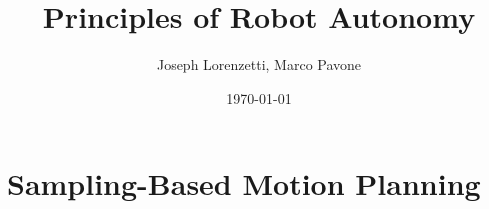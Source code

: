 \documentclass[nohyper,nobib]{tufte-book}
\title{Principles of Robot Autonomy}
\author{Joseph Lorenzetti, Marco Pavone}
\date{\today}
\begin{document}
\chapter{Sampling-Based Motion Planning}


\printbibliography
\end{document}
